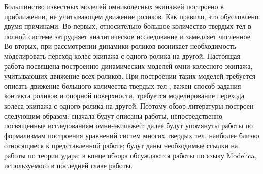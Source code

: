 Большинство известных моделей омниколесных экипажей построено в приближении, не учитывающем движение роликов. Как правило, это обусловлено двумя причинами. Во-первых, относительно большое количество твердых тел в полной системе затрудняет аналитическое исследование и замедляет численное. Во-вторых, при рассмотрении динамики роликов возникает необходимость моделировать переход колес экипажа с одного ролика на другой.
Настоящая работа посвящена построению динамических моделей омни-колесного экипажа, учитывающих движение всех роликов.%
При построении таких моделей требуется описать движение большого количества твердых тел%
, важен способ задания контакта роликов и опорной поверхности, требуется моделирование перехода колеса экипажа с одного ролика на другой.
Поэтому обзор литературы построен следующим образом: сначала будут описаны работы, непосредственно посвященные исследованиям омни-экипажей; далее будут упомянуты работы по формализмам построения уравнений систем многих твердых тел, наиболее близко относящиеся к представленной работе; будут даны необходимые ссылки на работы по теории удара; в конце обзора обсуждаются работы по языку Modelica, используемого в последней главе работы.


